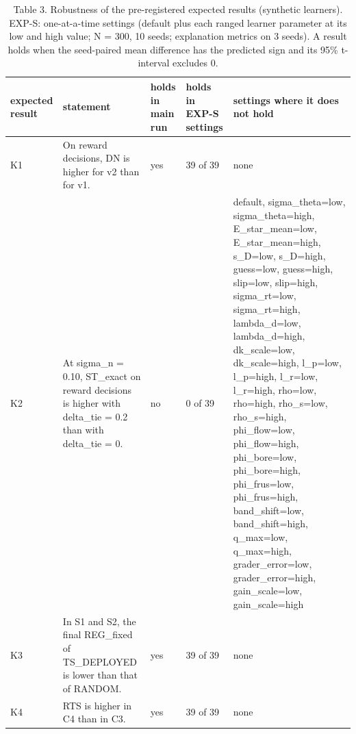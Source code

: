 \begin{table}[H]
\caption{Table 3. Robustness of the pre-registered expected results (synthetic learners). EXP-S: one-at-a-time settings (default plus each ranged learner parameter at its low and high value; N = 300, 10 seeds; explanation metrics on 3 seeds). A result holds when the seed-paired mean difference has the predicted sign and its 95\% t-interval excludes 0.}
\label{tab:table3_robustness}
\centering
\small
\begin{tabular}{lllll}
\toprule
expected result & statement & holds in main run & holds in EXP-S settings & settings where it does not hold \\
\midrule
K1 & On reward decisions, DN is higher for v2 than for v1. & yes & 39 of 39 & none \\
K2 & At sigma\_n = 0.10, ST\_exact on reward decisions is higher with delta\_tie = 0.2 than with delta\_tie = 0. & no & 0 of 39 & default, sigma\_theta=low, sigma\_theta=high, E\_star\_mean=low, E\_star\_mean=high, s\_D=low, s\_D=high, guess=low, guess=high, slip=low, slip=high, sigma\_rt=low, sigma\_rt=high, lambda\_d=low, lambda\_d=high, dk\_scale=low, dk\_scale=high, l\_p=low, l\_p=high, l\_r=low, l\_r=high, rho=low, rho=high, rho\_s=low, rho\_s=high, phi\_flow=low, phi\_flow=high, phi\_bore=low, phi\_bore=high, phi\_frus=low, phi\_frus=high, band\_shift=low, band\_shift=high, q\_max=low, q\_max=high, grader\_error=low, grader\_error=high, gain\_scale=low, gain\_scale=high \\
K3 & In S1 and S2, the final REG\_fixed of TS\_DEPLOYED is lower than that of RANDOM. & yes & 39 of 39 & none \\
K4 & RTS is higher in C4 than in C3. & yes & 39 of 39 & none \\
\bottomrule
\end{tabular}
\end{table}
